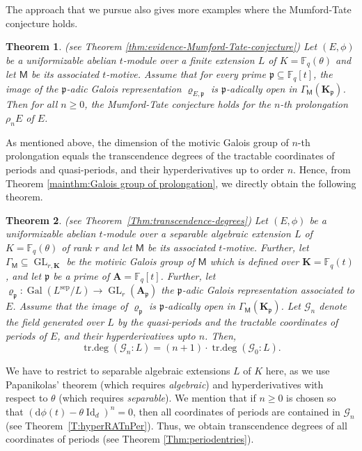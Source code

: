 \documentclass[10pt,a4paper]{amsart}
\theoremstyle{plain} %
\newtheorem{maintheorem}{Theorem}
\theoremstyle{definition}
\theoremstyle{remark}
\newcommand{\FF}{\mathbb{F}}
\newcommand{\fp}{\mathfrak{p}}  %
\newcommand{\bA}{\mathbf{A}}
\newcommand{\bK}{\mathbf{K}}
\newcommand{\rd}{\mathrm{d}}
\newcommand{\Id}{\operatorname{Id}}
\newcommand{\Fq}{\FF_{\!q}}  %
\newcommand{\Gal}{\operatorname{Gal}}
\newcommand{\trdeg}{\operatorname{tr.deg}}
\newcommand{\GL}{\operatorname{GL}}
\newcommand{\mot}{\mathsf{M}}  %
\numberwithin{equation}{subsection}
\begin{document}
The approach that we pursue also gives more examples where the Mumford-Tate conjecture holds.

\begin{maintheorem} (see Theorem \ref{thm:evidence-Mumford-Tate-conjecture})
\label{mainthm:Mumford-Tate-conjecture}
       Let $(E, \phi)$ be a uniformizable abelian $t$-module over a finite extension $L$ of $K=\Fq(\theta)$ and let $\mot$ be its associated $t$-motive. Assume that for every prime $\fp\subseteq \Fq[t]$, the image of the $\fp$-adic Galois representation $\varrho_{E,\fp}$ is $\fp$-adically open in $\Gamma_\mot(\bK_\fp)$.
    Then for all $n\geq 0$, the Mumford-Tate conjecture holds for the $n$-th prolongation $\rho_n E$ of $E$.
\end{maintheorem}


As mentioned above, the dimension of the motivic Galois group of $n$-th prolongation equals the transcendence degrees of the tractable coordinates of periods and quasi-periods, and their hyperderivatives up to order $n$. 
Hence, from Theorem \ref{mainthm:Galois group of prolongation}, we directly obtain the following theorem.


\begin{maintheorem}\label{mainthm:transcendence result}(see Theorem~\ref{Thm:transcendence-degrees})
Let $(E,\phi)$ be a uniformizable abelian $t$-module over a separable algebraic extension $L$ of $K=\Fq(\theta)$ of rank $r$ and let $\mot$ be its associated $t$-motive. Further, let $\Gamma_\mot\subseteq \GL_{r,\bK}$ be the motivic Galois group of $\mot$ which is defined over $\bK=\Fq(t)$, and let
	$\fp$ be a prime of $\bA=\Fq[t]$. Further, let $\varrho_\fp:\Gal(L^\mathrm{sep}/L)\to \GL_r(\bA_\fp)$ the $\fp$-adic Galois representation associated to $E$.
	Assume that the image of $\varrho_\fp$ is $\fp$-adically open in $\Gamma_\mot(\bK_\fp)$. Let $\mathcal{G}_n$ denote the field generated over $L$ by the quasi-periods and the tractable coordinates of periods of $E$, and their hyperderivatives upto $n$. Then, 
    \begin{equation}
        \trdeg(\mathcal{G}_n:L) = (n+1)\cdot \trdeg(\mathcal{G}_0:L). 
          \end{equation} 
\end{maintheorem}

We have to restrict to separable algebraic extensions $L$ of $K$ here, as we use Papanikolas' theorem (which requires \emph{algebraic}) and hyperderivatives with respect to $\theta$ (which requires \emph{separable}).
We mention that if $n\geq 0$ is chosen so that $(\rd\phi(t)-\theta \Id_d)^n=0$, then all coordinates of periods are contained in $\mathcal{G}_n$ (see Theorem~\ref{T:hyperRATnPer}).  
Thus, we obtain transcendence degrees of all coordinates of periods (see Theorem \ref{Thm:periodentries}). 
\end{document}

